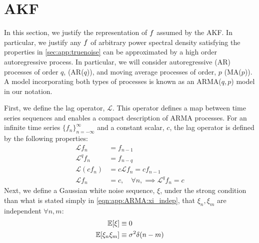 \newpage
\section{ AKF \label{sec:app:AKF}}

In this section, we justify the representation of $f$ assumed by the AKF. In particular, we justify any $f$ of arbitrary power spectral density satisfying the properties in \cref{sec:app:truenoise} can be approximated by a high order autoregressive process.   In particular, we will consider autoregressive (AR) processes of order $q$, (AR($q$)), and  moving average processes of order, $p$ (MA($p$)). A model incorporating both types of processes is known as an ARMA($q,p$) model in our notation. 

First, we define the lag operator, $\mathcal{L}$. This operator defines a map between time series sequences and enables a compact description of ARMA processes. For an infinite time series $\{ f_n \}_{n = -\infty}^{\infty}$ and a constant scalar, $c$, the lag operator is defined by the following properties:
\begin{align}
\mathcal{L} f_n & = f_{n-1} \\
\mathcal{L}^q f_n & = f_{n-q} \\
\mathcal{L}(cf_n) & = c\mathcal{L}f_n = cf_{n-1}  \\
\mathcal{L}f_n & = c, \quad \forall n, \implies \mathcal{L}^q f_n  = c
\end{align}
Next, we define a Gaussian white noise sequence, $\xi$, under the strong condition than what is stated simply in \cref{eqn:app:ARMA:xi_indep}, that $\xi_n, \xi_m$ are independent $\forall n, m $:
\begin{align}
\mathbb{E}[\xi] &\equiv 0  \\
\mathbb{E}[\xi_n \xi_m] &\equiv \sigma^2 \delta(n-m)\label{eqn:app:ARMA:xi_indep}   
\end{align}

